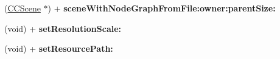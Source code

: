 \begin{DoxyCompactItemize}
\item 
\hypertarget{interface_c_c_b_reader_a049ea792503d75a1add7e1269beed512}{(\hyperlink{interface_c_c_scene}{C\-C\-Scene} $\ast$) + {\bfseries scene\-With\-Node\-Graph\-From\-File\-:owner\-:parent\-Size\-:}}\label{interface_c_c_b_reader_a049ea792503d75a1add7e1269beed512}

\item 
\hypertarget{interface_c_c_b_reader_a31bca6e46c8383acb9d92afd5c24ba42}{(void) + {\bfseries set\-Resolution\-Scale\-:}}\label{interface_c_c_b_reader_a31bca6e46c8383acb9d92afd5c24ba42}

\item 
\hypertarget{interface_c_c_b_reader_a1f428b68fc3d5e0e533dac80b5c0482c}{(void) + {\bfseries set\-Resource\-Path\-:}}\label{interface_c_c_b_reader_a1f428b68fc3d5e0e533dac80b5c0482c}

\end{DoxyCompactItemize}
